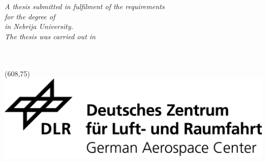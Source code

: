 \documentclass[
11pt, %
english, %
singlespacing, %
headsepline, %
]{MastersDoctoralThesis} %
\begin{document}
\begin{titlepage}
\begin{center}
\vfill

\large \textit{A thesis submitted in fulfilment of the requirements \\ for the degree of \degreename \\ in Nebrija University.}\\[0.3cm] %
\textit{The thesis was carried out in}\\[0.4cm]
\groupname\\\deptname\\[1cm] %
\vfill
\centerline{{\colorbox{white}{\makebox(608,75){\includegraphics[scale=0.65]{logos/DLR_Logo_EN_schwarz.png}}}}}

\vfill
\end{center}
\end{titlepage}
\pagecolor{white}


 
\end{document}
